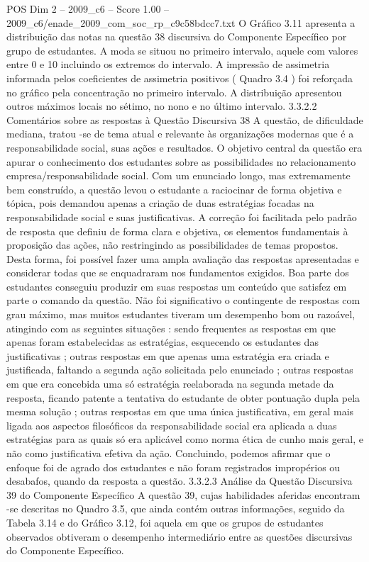 \begin{textsample}{POS Dim 2 – 2009\_c6 – Score 1.00 – 2009\_c6/enade\_2009\_com\_soc\_rp\_c9c58bdcc7.txt}
O Gráfico 3.11 apresenta a distribuição das notas na questão 38 discursiva do Componente Específico por grupo de estudantes.
A moda se situou no primeiro intervalo, aquele com valores entre 0 e 10 incluindo os extremos do intervalo.
A impressão de assimetria informada pelos coeficientes de assimetria positivos ( Quadro 3.4 ) foi reforçada no gráfico pela concentração no primeiro intervalo.
A distribuição apresentou outros máximos locais no sétimo, no nono e no último intervalo. 3.3.2.2 Comentários sobre as respostas à Questão Discursiva 38 A questão, de dificuldade mediana, tratou -se de tema atual e relevante às organizações modernas que é a responsabilidade social, suas ações e resultados.
O objetivo central da questão era apurar o conhecimento dos estudantes sobre as possibilidades no relacionamento empresa/responsabilidade social.
Com um enunciado longo, mas extremamente bem construído, a questão levou o estudante a raciocinar de forma objetiva e tópica, pois demandou apenas a criação de duas estratégias focadas na responsabilidade social e suas justificativas.
A correção foi facilitada pelo padrão de resposta que definiu de forma clara e objetiva, os elementos fundamentais à proposição das ações, não restringindo as possibilidades de temas propostos.
Desta forma, foi possível fazer uma ampla avaliação das respostas apresentadas e considerar todas que se enquadraram nos fundamentos exigidos.
Boa parte dos estudantes conseguiu produzir em suas respostas um conteúdo que satisfez em parte o comando da questão.
Não foi significativo o contingente de respostas com grau máximo, mas muitos estudantes tiveram um desempenho bom ou razoável, atingindo com as seguintes situações : sendo frequentes as respostas em que apenas foram estabelecidas as estratégias, esquecendo os estudantes das justificativas ; outras respostas em que apenas uma estratégia era criada e justificada, faltando a segunda ação solicitada pelo enunciado ; outras respostas em que era concebida uma só estratégia reelaborada na segunda metade da resposta, ficando patente a tentativa do estudante de obter pontuação dupla pela mesma solução ; outras respostas em que uma única justificativa, em geral mais ligada aos aspectos filosóficos da responsabilidade social era aplicada a duas estratégias para as quais só era aplicável como norma ética de cunho mais geral, e não como justificativa efetiva da ação.
Concluindo, podemos afirmar que o enfoque foi de agrado dos estudantes e não foram registrados impropérios ou desabafos, quando da resposta a questão. 3.3.2.3 Análise da Questão Discursiva 39 do Componente Específico A questão 39, cujas habilidades aferidas encontram -se descritas no Quadro 3.5, que ainda contém outras informações, seguido da Tabela 3.14 e do Gráfico 3.12, foi aquela em que os grupos de estudantes observados obtiveram o desempenho intermediário entre as questões discursivas do Componente Específico.

\end{textsample}
